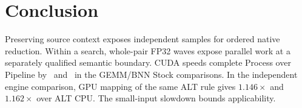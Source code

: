 \section{Conclusion}
Preserving source context exposes independent samples for ordered native reduction. Within a search, whole-pair FP32 waves expose parallel work at a separately qualified semantic boundary. CUDA speeds complete Process over Pipeline by \GemmNewPipeProc\ and \BnnNewPipeProc\ in the GEMM/BNN Stock comparisons. In the independent engine comparison, GPU mapping of the same ALT rule gives $1.146\times$ and $1.162\times$ over ALT CPU. The small-input slowdown bounds applicability.

